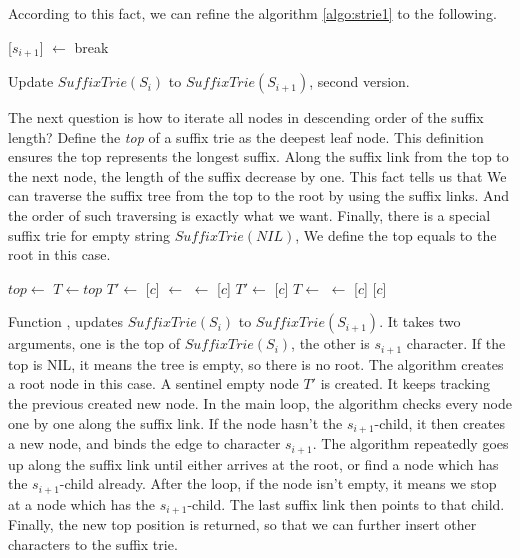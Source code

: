 \documentclass{article}
\begin{document}
According to this fact, we can refine the algorithm \ref{algo:strie1} to
the following.

\begin{algorithm}
  \begin{algorithmic}[1]
      \State {}[$s_{i+1}$] $\gets$ 
    \Else
      \State break
    \EndIf
  \EndFor
  \end{algorithmic}
  \caption{Update $SuffixTrie(S_i)$ to $SuffixTrie(S_{i+1})$, second version.}
  \label{algo:strie2}
\end{algorithm}

The next question is how to iterate all nodes
in descending order of the suffix length? Define the {\em top} of a suffix
trie as the deepest leaf node. This definition ensures the top represents
the longest suffix. Along the suffix link from the top to the next node,
the length of the suffix decrease by one. This fact tells us that
We can traverse the suffix tree from the top
to the root by using the suffix links. And the order of such traversing
is exactly what we want.
Finally, there is a special suffix trie for empty string $SuffixTrie(NIL)$,
We define the top equals to the root in this case.

\begin{algorithmic}
   
    \State $top \gets$ 
  \EndIf
  \State $T \gets top$
  \State $T' \gets$  
    \State {}[$c$] $\gets$ 
    \State {} $\gets$ [$c$]
    \State $T' \gets$ [$c$]
    \State $T \gets$ 
  \EndWhile
    \State {} $\gets$ [$c$]
  \EndIf
  \State \Return {}[$c$] 
\EndFunction
\end{algorithmic}

Function , updates $SuffixTrie(S_i)$ to $SuffixTrie(S_{i+1})$.
It takes two arguments, one is the top of $SuffixTrie(S_i)$, the other
is $s_{i+1}$ character. If the top is NIL, it means the tree is empty,
so there is no root. The algorithm creates a root node in this case.
A sentinel empty node $T'$ is created. It keeps tracking the previous
created new node. In the main loop, the algorithm checks every node
one by one along the suffix link. If the node hasn't the $s_{i+1}$-child,
it then creates a new node, and binds the edge to character $s_{i+1}$.
The algorithm repeatedly goes up along the suffix link until either
arrives at the root, or find a node which has the $s_{i+1}$-child already.
After the loop, if the node isn't empty, it means we stop at a node
which has the $s_{i+1}$-child.
The last suffix link then points to that child.
Finally, the new top position is returned, so that we can further
insert other characters to the suffix trie.
\end{document}
